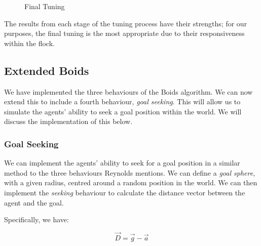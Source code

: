 \documentclass[12pt]{article}
\begin{document}
\begin{figure}[H]
    \caption{Final Tuning}
    \label{fig:exp3}
\end{figure}

The results from each stage of the tuning process have their strengths; for our purposes, the final tuning is the most appropriate due to their responsiveness within the flock.

\subsection{Extended Boids}
We have implemented the three behaviours of the Boids algorithm. We can now extend this to include a fourth behaviour, \emph{goal seeking}. This will allow us to simulate the agents' ability to seek a goal position within the world. We will discuss the implementation of this below.

\subsubsection{Goal Seeking}
\label{sec:goal-seek}
We can implement the agents' ability to seek for a goal position in a similar method to the three behaviours Reynolds mentions. We can define a \emph{goal sphere}, with a given radius, centred around a random position in the world. We can then implement the \emph{seeking} behaviour to calculate the distance vector between the agent and the goal. 

Specifically, we have:

\begin{equation}
\vec{D} = \vec{g} - \vec{a}
\end{equation}
\end{document}
